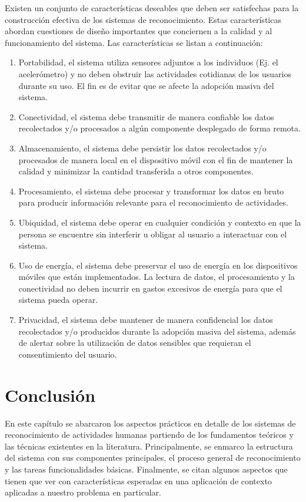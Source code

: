 \label{ssec46:caracteristicas}Existen un conjunto de características
deseables que deben ser satisfechas para la construcción efectiva
de los sistemas de reconocimiento. Estas características abordan cuestiones
de diseño importantes que conciernen a la calidad y al funcionamiento
del sistema. Las características se listan a continuación:
\begin{enumerate}
\item Portabilidad, el sistema utiliza sensores adjuntos a los individuos
(Ej. el acelerómetro) y no deben obstruir las actividades cotidianas
de los usuarios durante su uso. El fin es de evitar que se afecte
la adopción masiva del sistema. 
\item Conectividad, el sistema debe transmitir de manera confiable los datos
recolectados y/o procesados a algún componente desplegado de forma
remota. 
\item Almacenamiento, el sistema debe persistir los datos recolectados y/o
procesados de manera local en el dispositivo móvil con el fin de mantener
la calidad y minimizar la cantidad transferida a otros componentes.
\item Procesamiento, el sistema debe procesar y transformar los datos en
bruto para producir información relevante para el reconocimiento de
actividades.
\item Ubiquidad, el sistema debe operar en cualquier condición y contexto
en que la persona se encuentre sin interferir u obligar al usuario
a interactuar con el sistema.
\item Uso de energía, el sistema debe preservar el uso de energía en los
dispositivos móviles que están implementados. La lectura de datos,
el procesamiento y la conectividad no deben incurrir en gastos excesivos
de energía para que el sistema pueda operar.
\item Privacidad, el sistema debe mantener de manera confidencial los datos
recolectados y/o producidos durante la adopción masiva del sistema,
además de alertar sobre la utilización de datos sensibles que requieran
el consentimiento del usuario.
\end{enumerate}

\section{Conclusión}

En este capítulo se abarcaron los aspectos prácticos en detalle de
los sistemas de reconocimiento de actividades humanas partiendo de
los fundamentos teóricos y las técnicas existentes en la literatura.
Principalmente, se enmarco la estructura del sistema  con
sus componentes principales, el proceso general de reconocimiento
y las tareas funcionalidades básicas. Finalmente, se citan algunos
aspectos que tienen que ver con características esperadas en una aplicación
de contexto aplicadas a nuestro problema en particular.
